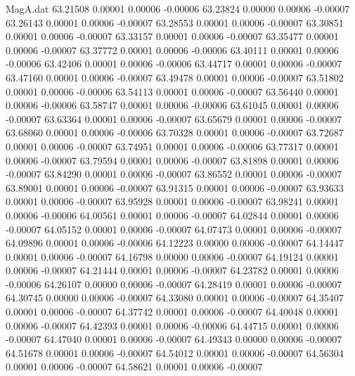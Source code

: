 \begin{filecontents}{MagA.dat}
  63.21508    0.00001    0.00006   -0.00006
  63.23824    0.00000    0.00006   -0.00007
  63.26143    0.00001    0.00006   -0.00007
  63.28553    0.00001    0.00006   -0.00007
  63.30851    0.00001    0.00006   -0.00007
  63.33157    0.00001    0.00006   -0.00007
  63.35477    0.00001    0.00006   -0.00007
  63.37772    0.00001    0.00006   -0.00006
  63.40111    0.00001    0.00006   -0.00006
  63.42406    0.00001    0.00006   -0.00006
  63.44717    0.00001    0.00006   -0.00007
  63.47160    0.00001    0.00006   -0.00007
  63.49478    0.00001    0.00006   -0.00007
  63.51802    0.00001    0.00006   -0.00006
  63.54113    0.00001    0.00006   -0.00007
  63.56440    0.00001    0.00006   -0.00006
  63.58747    0.00001    0.00006   -0.00006
  63.61045    0.00001    0.00006   -0.00007
  63.63364    0.00001    0.00006   -0.00007
  63.65679    0.00001    0.00006   -0.00007
  63.68060    0.00001    0.00006   -0.00006
  63.70328    0.00001    0.00006   -0.00007
  63.72687    0.00001    0.00006   -0.00007
  63.74951    0.00001    0.00006   -0.00006
  63.77317    0.00001    0.00006   -0.00007
  63.79594    0.00001    0.00006   -0.00007
  63.81898    0.00001    0.00006   -0.00007
  63.84290    0.00001    0.00006   -0.00007
  63.86552    0.00001    0.00006   -0.00007
  63.89001    0.00001    0.00006   -0.00007
  63.91315    0.00001    0.00006   -0.00007
  63.93633    0.00001    0.00006   -0.00007
  63.95928    0.00001    0.00006   -0.00007
  63.98241    0.00001    0.00006   -0.00006
  64.00561    0.00001    0.00006   -0.00007
  64.02844    0.00001    0.00006   -0.00007
  64.05152    0.00001    0.00006   -0.00007
  64.07473    0.00001    0.00006   -0.00007
  64.09896    0.00001    0.00006   -0.00006
  64.12223    0.00000    0.00006   -0.00007
  64.14447    0.00001    0.00006   -0.00007
  64.16798    0.00000    0.00006   -0.00007
  64.19124    0.00001    0.00006   -0.00007
  64.21444    0.00001    0.00006   -0.00007
  64.23782    0.00001    0.00006   -0.00006
  64.26107    0.00000    0.00006   -0.00007
  64.28419    0.00001    0.00006   -0.00007
  64.30745    0.00000    0.00006   -0.00007
  64.33080    0.00001    0.00006   -0.00007
  64.35407    0.00001    0.00006   -0.00007
  64.37742    0.00001    0.00006   -0.00007
  64.40048    0.00001    0.00006   -0.00007
  64.42393    0.00001    0.00006   -0.00006
  64.44715    0.00001    0.00006   -0.00007
  64.47040    0.00001    0.00006   -0.00007
  64.49343    0.00000    0.00006   -0.00007
  64.51678    0.00001    0.00006   -0.00007
  64.54012    0.00001    0.00006   -0.00007
  64.56304    0.00001    0.00006   -0.00007
  64.58621    0.00001    0.00006   -0.00007

\end{filecontents}
